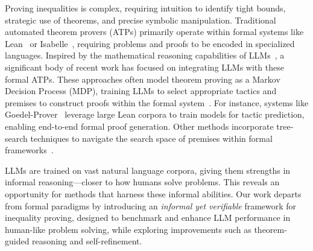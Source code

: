 Proving inequalities is complex, requiring intuition to identify tight bounds, strategic use of theorems, and precise symbolic manipulation. Traditional automated theorem provers (ATPs) primarily operate within formal systems like Lean~\cite{Moura2015TheLT} or Isabelle~\cite{nipkow2002isabelle}, requiring problems and proofs to be encoded in specialized languages. Inspired by the mathematical reasoning capabilities of LLMs~\cite{zhao2025enhancing}, a significant body of recent work has focused on integrating LLMs with these formal ATPs. These approaches often model theorem proving as a Markov Decision Process (MDP), training LLMs to select appropriate tactics and premises to construct proofs within the formal system~\cite{achim2025aristotle,  chen2025seed, wang2025malot, dong2024formal, gloeckle2024abel, hu2025minictx, lin2025leanstar, wang2024legoprover, xuejun2025mathesis}. For instance, systems like Goedel-Prover~\cite{lin2025goedel} leverage large Lean corpora to train models for tactic prediction, enabling end-to-end formal proof generation. Other methods incorporate tree-search techniques to navigate the search space of premises within formal frameworks~\cite{wu2024internlm25stepprover, li2024hunyuanprover, xin2025bfs, xin2025scaling}. 

\vspace{-1mm}
LLMs are trained on vast natural language corpora, giving them strengths in informal reasoning—closer to how humans solve problems. This reveals an opportunity for methods that harness these informal abilities. Our work departs from formal paradigms by introducing an \textit{informal yet verifiable} framework for inequality proving, designed to benchmark and enhance LLM performance in human-like problem solving, while exploring improvements such as theorem-guided reasoning and self-refinement.

\vspace{-3mm}
